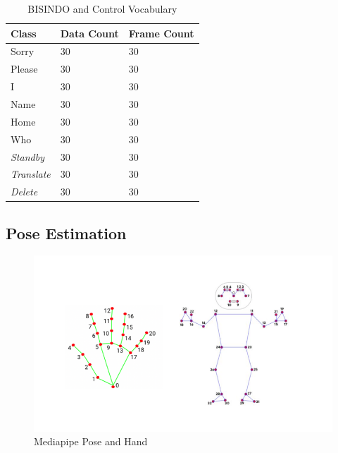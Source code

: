 \begin{table}[H]
  \caption{BISINDO and Control Vocabulary}
  \label{tb:kosakataBISINDO}
  \centering
  \begin{tabular}{lll}
    \toprule
    \textbf{Class} & \textbf{Data Count} & \textbf{Frame Count} \\
    \midrule
    Sorry                       & 30            & 30 \\
    Please                      & 30            & 30 \\
    I                           & 30            & 30 \\
    Name                        & 30            & 30 \\
    Home                        & 30            & 30 \\
    Who                         & 30            & 30 \\
    \textit{Standby}                       & 30             & 30 \\
    \textit{Translate}                     & 30             & 30 \\
    \textit{Delete}                        & 30             & 30 \\
    \bottomrule
  \end{tabular}
\end{table}

\subsection{Pose Estimation}
\label{subsec:poseestimation}

\begin{figure}[ht]
  \centering
  \includegraphics[scale=0.4]{gambar/bab3-pose-combine.png}
  \caption{Mediapipe Pose and Hand}
  \label{fig:estimasipose}
\end{figure}

